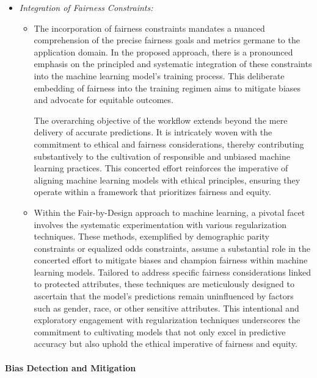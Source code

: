 \begin{itemize}

    \item \emph{Integration of Fairness Constraints:}

    \begin{itemize}

        \item The incorporation of fairness constraints mandates a nuanced comprehension of the precise fairness goals and metrics germane to the application domain. In the proposed approach, there is a pronounced emphasis on the principled and systematic integration of these constraints into the machine learning model's training process. This deliberate embedding of fairness into the training regimen aims to mitigate biases and advocate for equitable outcomes.

        The overarching objective of the workflow extends beyond the mere delivery of accurate predictions. It is intricately woven with the commitment to ethical and fairness considerations, thereby contributing substantively to the cultivation of responsible and unbiased machine learning practices. This concerted effort reinforces the imperative of aligning machine learning models with ethical principles, ensuring they operate within a framework that prioritizes fairness and equity.

        \item Within the Fair-by-Design approach to machine learning, a pivotal facet involves the systematic experimentation with various regularization techniques. These methods, exemplified by demographic parity constraints or equalized odds constraints, assume a substantial role in the concerted effort to mitigate biases and champion fairness within machine learning models. Tailored to address specific fairness considerations linked to protected attributes, these techniques are meticulously designed to ascertain that the model's predictions remain uninfluenced by factors such as gender, race, or other sensitive attributes. This intentional and exploratory engagement with regularization techniques underscores the commitment to cultivating models that not only excel in predictive accuracy but also uphold the ethical imperative of fairness and equity.
    
    \end{itemize}

\end{itemize}

\paragraph{Bias Detection and Mitigation}

